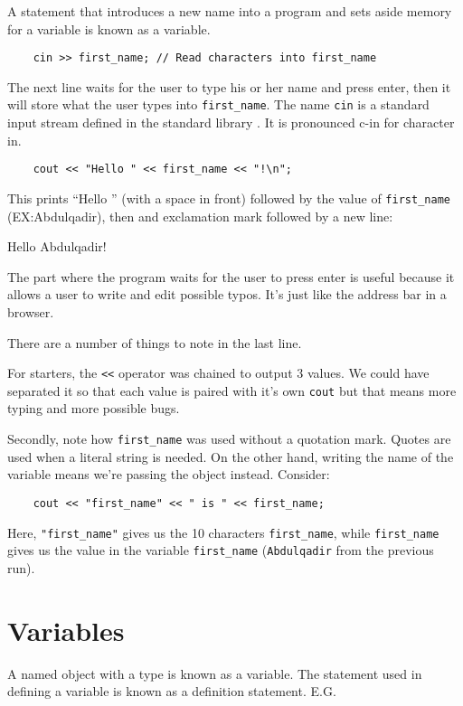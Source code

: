 \documentclass{book}
\begin{document}
A statement that introduces a new name into a program and sets aside memory for a variable is known as a variable.

\begin{verbatim}
	cin >> first_name; // Read characters into first_name
\end{verbatim}

The next line waits for the user to type his or her name and press enter, then it will store what the user types into \verb|first_name|. The name \verb|cin| is a standard input stream defined in the standard library . It is pronounced c-in for character in.

\begin{verbatim}
	cout << "Hello " << first_name << "!\n";
\end{verbatim}

This prints ``Hello '' (with a space in front) followed by the value of \verb|first_name| (EX:\@ Abdulqadir), then and exclamation mark followed by a new line:

\begin{verb}
Hello Abdulqadir!

\end{verb}

The part where the program waits for the user to press enter is useful because it allows a user to write and edit possible typos. It's just like the address bar in a browser.

There are a number of things to note in the last line.

For starters, the \verb|<<| operator was chained to output 3 values. We could have separated it so that each value is paired with it's own \verb|cout| but that means more typing and more possible bugs.

Secondly, note how \verb|first_name| was used without a quotation mark. Quotes are used when a literal string is needed. On the other hand, writing the name of the variable means we're passing the object instead. Consider:

\begin{verbatim}
	cout << "first_name" << " is " << first_name;
\end{verbatim}

Here, \verb|"first_name"| gives us the 10 characters \verb|first_name|, while \verb|first_name| gives us the value in the variable \verb|first_name| (\verb|Abdulqadir| from the previous run).

\section{Variables}
A named object with a type is known as a variable. The statement used in defining a variable is known as a definition statement. E.G.
\end{document}
